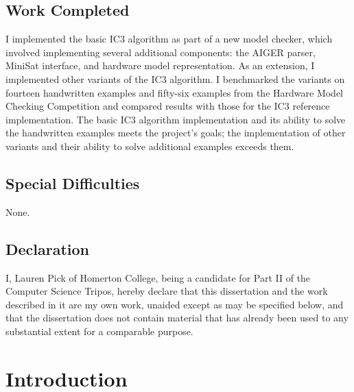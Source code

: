 \documentclass[12pt,a4paper,twoside,openright]{report}
\begin{document}
\section*{Work Completed}

I implemented the basic IC3 algorithm as part of a new model checker,
which involved implementing several additional components: the AIGER parser,
MiniSat interface, and hardware model representation.
As an extension, I implemented other variants of the IC3 algorithm.
I benchmarked the variants on fourteen handwritten examples and
fifty-six examples from the Hardware
Model Checking Competition and compared results with those for
the IC3 reference implementation. The basic IC3 algorithm implementation
and its ability to solve
the handwritten examples meets the project's goals;
the implementation of other variants and their ability to solve
additional examples exceeds them.

\section*{Special Difficulties}

None.
 
\newpage
\section*{Declaration}

I, Lauren Pick of Homerton College, being a candidate for Part II of the Computer
Science Tripos, hereby declare
that this dissertation and the work described in it are my own work,
unaided except as may be specified below, and that the dissertation
does not contain material that has already been used to any substantial
extent for a comparable purpose.

\bigskip
{}

\medskip
{}

\tableofcontents





\pagestyle{headings}

\chapter{Introduction}
\end{document}
